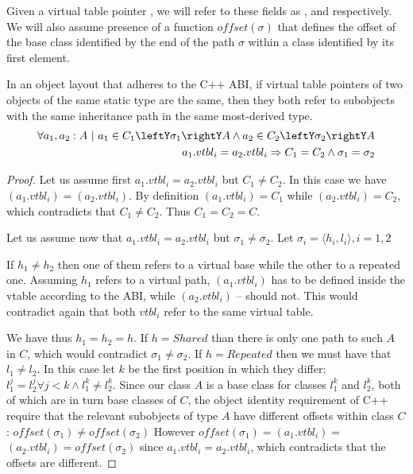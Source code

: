 \noindent
Given a virtual table pointer , we will refer to these fields as 
,  and  respectively. 
We will also assume presence of a function $offset(\sigma)$ that defines the 
offset of the base class identified by the end of the path $\sigma$ within a 
class identified by its first element.

\begin{theorem}
In an object layout that adheres to the C++ ABI, if virtual table pointers of two 
objects of the same static type are the same, then they both refer to subobjects 
with the same inheritance path in the same most-derived type.
\begin{eqnarray*}
    \forall a_1, a_2 : A\ |\ a_1\in C_1\leftY\sigma_1\rightY A \wedge a_2\in C_2\leftY\sigma_2\rightY A \\
    a_1.vtbl_i = a_2.vtbl_i \Rightarrow C_1 = C_2 \wedge \sigma_1 = \sigma_2
\end{eqnarray*}
\label{thm:vtbl}
\end{theorem}
\begin{proof}
Let us assume first $a_1.vtbl_i = a_2.vtbl_i$ but $C_1 \neq C_2$. In this case we 
have $(a_1.vtbl_i) = $$(a_2.vtbl_i)$. By definition 
$(a_1.vtbl_i) = C_1$ while $(a_2.vtbl_i) = C_2$, which 
contradicts that $C_1 \neq C_2$. Thus $C_1 = C_2 = C$.

Let us assume now that $a_1.vtbl_i = a_2.vtbl_i$ but $\sigma_1 \neq \sigma_2$. 
Let $\sigma_i=\langle h_i,l_i\rangle,i=1,2$ 

If $h_1 \neq h_2$ then one of them refers to a virtual base while the other to a 
repeated one. Assuming $h_1$ refers to a virtual path, $(a_1.vtbl_i)$ 
has to be defined inside the vtable according to the ABI, while 
$(a_2.vtbl_i)$ -- should not. This would contradict again that both 
$vtbl_i$ refer to the same virtual table.

We have thus $h_1 = h_2 = h$. If $h = Shared$ than there is only one path to 
such $A$ in $C$, which would contradict $\sigma_1 \neq \sigma_2$. 
If $h = Repeated$ then we must have that $l_1 \neq l_2$. In this case let $k$ be 
the first position in which they differ: 
$l_1^j=l_2^j \forall j<k \wedge l_1^k\neq l_2^k$. Since our class $A$ is a base 
class for classes $l_1^k$ and $l_2^k$, both of which are in turn base classes of 
$C$, the object identity requirement of C++ require that the relevant subobjects 
of type $A$ have different offsets within class $C$: 
$offset(\sigma_1)\neq offset(\sigma_2)$ However 
$offset(\sigma_1)=$$(a_1.vtbl_i)=$$(a_2.vtbl_i)=offset(\sigma_2)$ 
since $a_1.vtbl_i = a_2.vtbl_i$, which contradicts that the offsets are different.
\end{proof}

